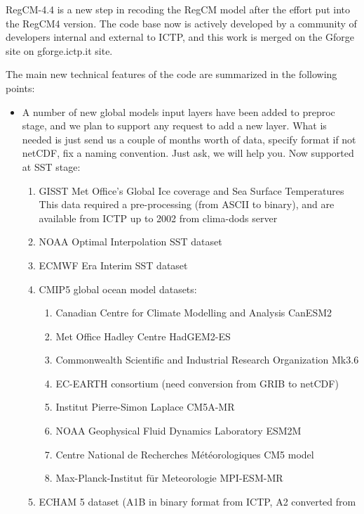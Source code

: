 %
%

RegCM-4.4 is a new step in recoding the RegCM model after the effort put into
the RegCM4 version. The code base now is actively developed by a community
of developers internal and external to ICTP, and this work is merged on the
Gforge site on gforge.ictp.it site.

The main new technical features of the code are summarized in the following
points:

\begin{itemize}
  \item A number of new global models input layers have been added to preproc
    stage, and we plan to support any request to add a new layer.
    What is needed is just send us a couple of months worth of data, specify
    format if not netCDF, fix a naming convention. Just ask, we will help you.
    Now supported at SST stage:
  \begin{enumerate}
    \item GISST Met Office's Global Ice coverage and Sea Surface Temperatures
     This data required a pre-processing (from ASCII to binary), and are
     available from ICTP up to 2002 from clima-dods server
    \item NOAA Optimal Interpolation SST dataset
    \item ECMWF Era Interim SST dataset
    \item CMIP5 global ocean model datasets:
      \begin{enumerate}
        \item Canadian Centre for Climate Modelling and Analysis CanESM2
        \item Met Office Hadley Centre HadGEM2-ES
        \item Commonwealth Scientific and Industrial Research Organization Mk3.6
        \item EC-EARTH consortium (need conversion from GRIB to netCDF)
        \item Institut Pierre-Simon Laplace CM5A-MR
        \item NOAA Geophysical Fluid Dynamics Laboratory ESM2M
        \item Centre National de Recherches Météorologiques CM5 model
        \item Max-Planck-Institut für Meteorologie MPI-ESM-MR
      \end{enumerate}
    \item ECHAM 5 dataset (A1B in binary format from ICTP, A2 converted from

\end{enumerate}
\end{itemize}
